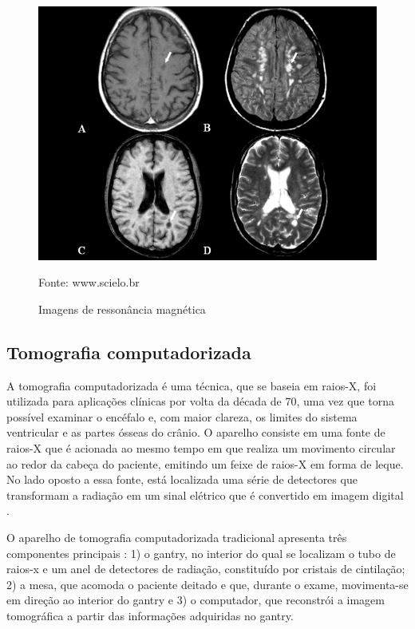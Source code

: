 \documentclass[openright]{UFRGS} %
\begin{document}
\begin{figure}[h]
    \centering
    \caption{Imagens de ressonância magnética}
    \includegraphics[scale=0.35]{figuras/image006.png}
    \centerline{Fonte: www.scielo.br}
    \label{fig:ressonacia}
\end{figure}

\subsection{Tomografia computadorizada}

A tomografia computadorizada é uma técnica, que se baseia em raios-X, foi utilizada para aplicações clínicas por volta da década de 70, uma vez que
torna possível examinar o encéfalo e, com maior clareza, os
limites do sistema ventricular e as partes ósseas do crânio. O
aparelho consiste em uma fonte de raios-X que é acionada ao
mesmo tempo em que realiza um movimento circular ao redor
da cabeça do paciente, emitindo um feixe de raios-X em forma
de leque. No lado oposto a essa fonte, está localizada uma série de detectores que transformam a radiação em um sinal elétrico que é convertido em imagem digital \cite{garib2007tomografia}.

O aparelho de tomografia computadorizada tradicional apresenta três componentes principais : 1) o gantry, no interior do qual se localizam o tubo de raios-x e um anel de detectores de radiação, constituído por cristais de cintilação; 2) a mesa, que acomoda o paciente deitado e que, durante o exame, movimenta-se em direção ao interior do gantry e 3) o computador, que reconstrói a imagem tomográfica a partir das informações adquiridas no gantry.
\end{document}

